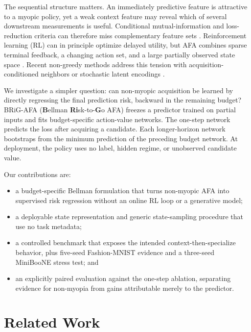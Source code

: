 \documentclass[10pt]{article}
\newcommand{\method}{BRiG-AFA}
\begin{document}
The sequential structure matters. An immediately predictive feature is attractive to a myopic policy, yet a weak context feature may reveal which of several downstream measurements is useful. Conditional mutual-information and loss-reduction criteria can therefore miss complementary feature sets \citep{gadgil2024dime,valancius2024aco,norcliffe2025sefa}. Reinforcement learning (RL) can in principle optimize delayed utility, but AFA combines sparse terminal feedback, a changing action set, and a large partially observed state space \citep{shim2018jafa,li2021gsm}. Recent non-greedy methods address this tension with acquisition-conditioned neighbors or stochastic latent encodings \citep{valancius2024aco,norcliffe2025sefa}.

We investigate a simpler question: can non-myopic acquisition be learned by directly regressing the final prediction risk, backward in the remaining budget? \method{} (\textbf{B}ellman \textbf{Ri}sk-to-\textbf{G}o AFA) freezes a predictor trained on partial inputs and fits budget-specific action-value networks. The one-step network predicts the loss after acquiring a candidate. Each longer-horizon network bootstraps from the minimum prediction of the preceding budget network. At deployment, the policy uses no label, hidden regime, or unobserved candidate value.

Our contributions are:
\begin{itemize}[leftmargin=1.4em,itemsep=2pt,topsep=3pt]
    \item a budget-specific Bellman formulation that turns non-myopic AFA into supervised risk regression without an online RL loop or a generative model;
    \item a deployable state representation and generic state-sampling procedure that use no task metadata;
    \item a controlled benchmark that exposes the intended context-then-specialize behavior, plus five-seed Fashion-MNIST evidence and a three-seed MiniBooNE stress test; and
    \item an explicitly paired evaluation against the one-step ablation, separating evidence for non-myopia from gains attributable merely to the predictor.
\end{itemize}

\section{Related Work}
\end{document}
